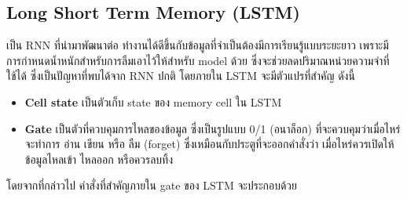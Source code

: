 \subsection{Long Short Term Memory (LSTM)}
เป็น RNN ที่นำมาพัฒนาต่อ ทำงานได้ดีขึ้นกับข้อมูลที่จำเป็นต้องมีการเรียนรู้แบบระยะยาว เพราะมีการกำหนดน้ำหนักสำหรับการลืมเอาไว้ให้สำหรับ model ด้วย ซึ่งจะช่วยลดปริมาณหน่วยความจำที่ใช้ได้ ซึ่งเป็นปัญหาที่พบได้จาก RNN ปกติ โดยภายใน LSTM จะมีตัวแปรที่สำคัญ ดังนี้
\begin{itemize}
    \item \textbf{Cell state} เป็นตัวเก็บ state ของ memory cell ใน LSTM
    \item \textbf{Gate} เป็นตัวที่ควบคุมการไหลของข้อมูล ซึ่งเป็นรูปแบบ 0/1 (อนาล็อก) ที่จะควบคุมว่าเมื่อไหร่จะทำการ อ่าน เขียน หรือ ลืม (forget) ซึ่งเหมือนกับประตูที่จะออกคำสั่งว่า เมื่อไหร่ควรเปิดให้ข้อมูลไหลเข้า ไหลออก หรือควรลบทิ้ง
\end{itemize}
โดยจากที่กล่าวไป คำสั่งที่สำคัญภายใน gate ของ LSTM จะประกอบด้วย
